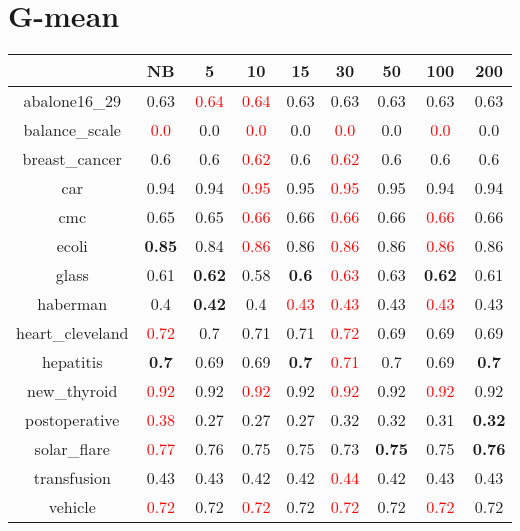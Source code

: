 \documentclass{article}%
\begin{document}
\section*{G{-}mean}%
\begin{tabular}{c|cccccccc}%
\hline%
&NB&5&10&15&30&50&100&200\\%
\hline%
abalone16\_29&0.63&\textcolor{red}{ 
0.64
}&\textcolor{red}{ 
0.64
}&0.63&0.63&0.63&0.63&0.63\\%
\hline%
balance\_scale&\textcolor{red}{ 
0.0
}&0.0&\textcolor{red}{ 
0.0
}&0.0&\textcolor{red}{ 
0.0
}&0.0&\textcolor{red}{ 
0.0
}&0.0\\%
\hline%
breast\_cancer&0.6&0.6&\textcolor{red}{ 
0.62
}&0.6&\textcolor{red}{ 
0.62
}&0.6&0.6&0.6\\%
\hline%
car&0.94&0.94&\textcolor{red}{ 
0.95
}&0.95&\textcolor{red}{ 
0.95
}&0.95&0.94&0.94\\%
\hline%
cmc&0.65&0.65&\textcolor{red}{ 
0.66
}&0.66&\textcolor{red}{ 
0.66
}&0.66&\textcolor{red}{ 
0.66
}&0.66\\%
\hline%
ecoli&\textbf{0.85}&0.84&\textcolor{red}{ 
0.86
}&0.86&\textcolor{red}{ 
0.86
}&0.86&\textcolor{red}{ 
0.86
}&0.86\\%
\hline%
glass&0.61&\textbf{0.62}&0.58&\textbf{0.6}&\textcolor{red}{ 
0.63
}&0.63&\textbf{0.62}&0.61\\%
\hline%
haberman&0.4&\textbf{0.42}&0.4&\textcolor{red}{ 
0.43
}&\textcolor{red}{ 
0.43
}&0.43&\textcolor{red}{ 
0.43
}&0.43\\%
\hline%
heart\_cleveland&\textcolor{red}{ 
0.72
}&0.7&0.71&0.71&\textcolor{red}{ 
0.72
}&0.69&0.69&0.69\\%
\hline%
hepatitis&\textbf{0.7}&0.69&0.69&\textbf{0.7}&\textcolor{red}{ 
0.71
}&0.7&0.69&\textbf{0.7}\\%
\hline%
new\_thyroid&\textcolor{red}{ 
0.92
}&0.92&\textcolor{red}{ 
0.92
}&0.92&\textcolor{red}{ 
0.92
}&0.92&\textcolor{red}{ 
0.92
}&0.92\\%
\hline%
postoperative&\textcolor{red}{ 
0.38
}&0.27&0.27&0.27&0.32&0.32&0.31&\textbf{0.32}\\%
\hline%
solar\_flare&\textcolor{red}{ 
0.77
}&0.76&0.75&0.75&0.73&\textbf{0.75}&0.75&\textbf{0.76}\\%
\hline%
transfusion&0.43&0.43&0.42&0.42&\textcolor{red}{ 
0.44
}&0.42&0.43&0.43\\%
\hline%
vehicle&\textcolor{red}{ 
0.72
}&0.72&\textcolor{red}{ 
0.72
}&0.72&\textcolor{red}{ 
0.72
}&0.72&\textcolor{red}{ 
0.72
}&0.72\\%

\end{tabular}
\end{document}
